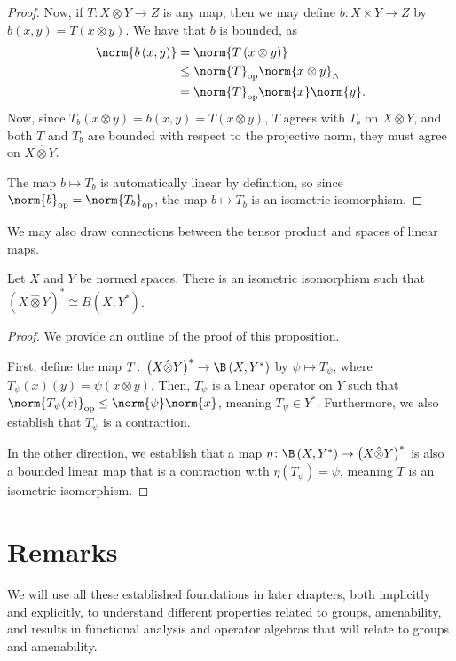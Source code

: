 \begin{proof}
  Now, if $T\colon X\otimes Y\rightarrow Z$ is any map, then we may define $b\colon X\times Y \rightarrow Z$ by $b\left( x,y \right) = T\left( x\otimes y \right)$. We have that $b$ is bounded, as
  \begin{align*}
    \norm{b\left( x,y \right)} &= \norm{T\left( x\otimes y \right)}\\
                               &\leq \norm{T}_{\op}\norm{x\otimes y}_{\wedge}\\
                               &= \norm{T}_{\op}\norm{x}\norm{y}.
  \end{align*}
  Now, since $T_b\left( x\otimes y \right) = b\left( x,y \right) = T\left( x\otimes y \right)$, $T$ agrees with $T_b$ on $X\otimes Y$, and both $T$ and $T_b$ are bounded with respect to the projective norm, they must agree on $X\hat\otimes Y$.\newline

  The map $b\mapsto T_b$ is automatically linear by definition, so since $\norm{b}_{\op} = \norm{T_b}_{\op}$, the map $b\mapsto T_b$ is an isometric isomorphism.
\end{proof}
We may also draw connections between the tensor product and spaces of linear maps.
\begin{proposition}
  Let $X$ and $Y$ be normed spaces. There is an isometric isomorphism such that $\left( X\hat\otimes Y \right)^{\ast} \cong B\left( X,Y^{\ast} \right)$.
\end{proposition}
\begin{proof}
  We provide an outline of the proof of this proposition.\newline

  First, define the map $T\colon \left( X\hat\otimes Y \right)^{\ast}\rightarrow \B\left( X,Y^{\ast} \right)$ by $\psi\mapsto T_{\psi}$, where $T_{\psi}\left( x \right)\left( y \right) = \psi\left( x\otimes y \right)$. Then, $T_{\psi}$ is a linear operator on $Y$ such that $\norm{T_{\psi}(x)}_{\op}\leq \norm{\psi}\norm{x}$, meaning $T_{\psi}\in Y^{\ast}$. Furthermore, we also establish that $T_{\psi}$ is a contraction.\newline

  In the other direction, we establish that a map $\eta\colon \B\left( X,Y^{\ast} \right)\rightarrow \left( X\hat\otimes Y \right)^{\ast}$ is also a bounded linear map that is a contraction with $\eta\left( T_{\psi} \right) = \psi$, meaning $T$ is an isometric isomorphism.
\end{proof}
\section{Remarks}%
We will use all these established foundations in later chapters, both implicitly and explicitly, to understand different properties related to groups, amenability, and results in functional analysis and operator algebras that will relate to groups and amenability.\newline

